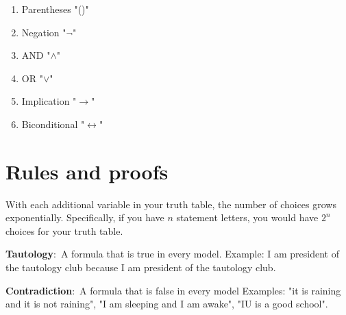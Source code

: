 \documentclass[nobib]{tufte-handout}
\newcommand{\defn}[2]{\noindent\textbf{#1}:\ #2}
\let\biconditional\leftrightarrow
\begin{document}
\begin{enumerate}
    \item Parentheses "()"
    \item Negation "$\neg$"
    \item AND "$\land$"
    \item OR "$\lor$"
    \item Implication "$\rightarrow$"
    \item Biconditional "$\biconditional$"
\end{enumerate}

\pagebreak 

\section{Rules and proofs}

With each additional variable in your truth table, the number
of choices grows exponentially. Specifically, if you have $n$ statement
letters, you would have $2^n$ choices for your truth table. 

\defn{Tautology}{A formula that is true in every model.} 
Example: I am president of the tautology club because 
I am president of the tautology club. 

\defn{Contradiction}{A formula that is false in every model} Examples:
"it is raining and it is not raining", "I am sleeping and I am awake", 
"IU is a good school". 

\end{document}
